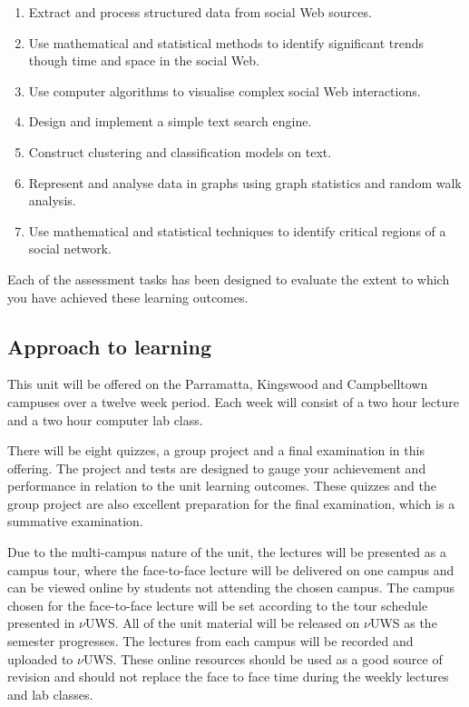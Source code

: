 \documentclass{uws_learning_guide}
\newcommand{\vuws}{$\nu$UWS}
\begin{document}
\begin{enumerate}
\item Extract and process structured data from social Web sources.
\item Use mathematical and statistical methods to identify significant
  trends though time and space in the social Web.
\item Use computer algorithms to visualise complex social Web
  interactions.
\item Design and implement a simple text search engine.
\item Construct clustering and classification models on text.
\item Represent and analyse data in graphs using graph statistics and
  random walk analysis.
\item Use mathematical and statistical techniques to identify critical
  regions of a social network.
\end{enumerate}

Each of the assessment tasks has been designed to evaluate the extent
to which you have achieved these learning outcomes.


\subsection{Approach to learning}


This unit will be offered on the Parramatta, Kingswood and
Campbelltown campuses over a twelve week period.  Each week will
consist of a two hour lecture and a two hour computer lab class.



There will be eight quizzes, a group project and a final examination in this
offering.  The project and tests are designed to gauge your
achievement and performance in relation to the unit learning outcomes.
These quizzes and the group project are also excellent preparation for the final
examination, which is a summative examination.


Due to the multi-campus nature of the unit, the lectures will be
presented as a campus tour, where the face-to-face lecture will be
delivered on one campus and can be viewed online by students not
attending the chosen campus. The campus chosen for the face-to-face
lecture will be set according to the tour schedule presented in \vuws{}.
All of the unit material will be released on \vuws{} as the semester
progresses.  The lectures from each campus will be recorded and
uploaded to \vuws{}.  These online resources should be used as a good
source of revision and should not replace the face to face time during
the weekly lectures and lab classes.
\end{document}
